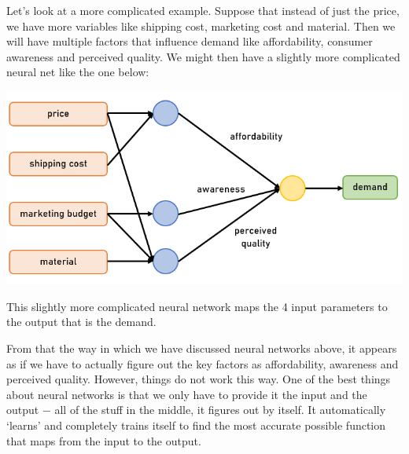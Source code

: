 \documentclass{article}[a4paper,12pt]
\theoremstyle{definition}
\begin{document}
Let's look at a more complicated example. Suppose that instead of just the price, we have more variables like shipping cost, marketing cost and material. Then we will have multiple factors that influence demand like affordability, consumer awareness and perceived quality. We might then have a slightly more complicated neural net like the one below:
\begin{center}\includegraphics{deep_learning2.png}\end{center}
This slightly more complicated neural network maps the 4 input parameters to the output that is the demand.
\vspace{6pt}

From that the way in which we have discussed neural networks above, it appears as if we have to actually figure out the key factors as affordability, awareness and perceived quality. However, things do not work this way. One of the best things about neural networks is that we only have to provide it the input and the output $-$ all of the stuff in the middle, it figures out by itself. It automatically `learns' and completely trains itself to find the most accurate possible function that maps from the input to the output.
\vspace{6pt}
\end{document}
